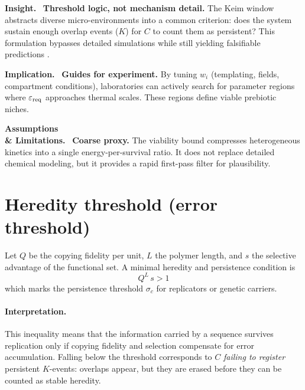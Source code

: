 \documentclass[12pt,a4paper,oneside]{scrreprt}
\newenvironment{insight}{\par\vspace{0.5em}\noindent\textbf{Insight.}\ }{\par\vspace{0.5em}}
\newenvironment{implication}{\par\vspace{0.5em}\noindent\textbf{Implication.}\ }{\par\vspace{0.5em}}
\newenvironment{limitation}{\par\vspace{0.5em}\noindent\textbf{Assumptions \\ \& Limitations.}\ }{\par\vspace{0.5em}}
\begin{document}
\begin{insight}
\textbf{Threshold logic, not mechanism detail.} 
The Keim window abstracts diverse micro-environments 
into a common criterion: 
does the system sustain enough overlap events ($K$) 
for $C$ to count them as persistent? 
This formulation bypasses detailed simulations 
while still yielding falsifiable predictions 
\citep{Eigen1971Selforganization,Orgel1998Origins}.
\end{insight}

\begin{implication}
\textbf{Guides for experiment.} 
By tuning $w_i$ (templating, fields, compartment conditions), 
laboratories can actively search for parameter regions 
where $\varepsilon_{\rm req}$ approaches thermal scales. 
These regions define viable prebiotic niches. 
\end{implication}

\begin{limitation}
\textbf{Coarse proxy.} 
The viability bound compresses heterogeneous kinetics 
into a single energy-per-survival ratio. 
It does not replace detailed chemical modeling, 
but it provides a rapid first-pass filter for plausibility. 
\end{limitation}

\section{Heredity threshold (error threshold)}\label{sec:life-heredity}

Let $Q$ be the copying fidelity per unit, $L$ the polymer length, 
and $s$ the selective advantage of the functional set. 
A minimal heredity and persistence condition is
\begin{equation}
\boxed{Q^{L}\,s > 1}
\end{equation}
which marks the persistence threshold $\sigma_c$ 
for replicators or genetic carriers. 

\paragraph{Interpretation.}
This inequality means that the information carried by a sequence 
survives replication only if copying fidelity and selection 
compensate for error accumulation. 
Falling below the threshold corresponds to $C$ 
\emph{failing to register} persistent $K$-events: 
overlaps appear, but they are erased before 
they can be counted as stable heredity. 
\end{document}
